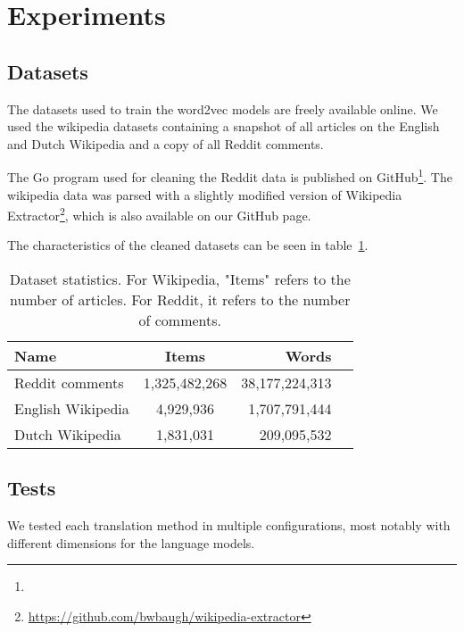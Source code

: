 \section{Experiments}
\label{sec:experiments}

\subsection{Datasets}
The datasets used to train the word2vec models are freely available online. We used the wikipedia datasets containing a snapshot of all articles on the English and Dutch Wikipedia and a copy of all Reddit comments.

The Go program used for cleaning the Reddit data is published on GitHub\footnote{\gh}. The wikipedia data was parsed with a slightly modified version of Wikipedia Extractor\footnote{\url{https://github.com/bwbaugh/wikipedia-extractor}}, which is also available on our GitHub page.

The characteristics of the cleaned datasets can be seen in table~\ref{table:datasets}.

%
%
\begin{table}[ht!]
	\centering
	\label{table:datasets}
	\begin{tabular}{|l|c|r|r|}
	\hline
	Name																												& Items			& Words			\\
	\hline
	Reddit comments \tablefootnote{\url{http://academictorrents.com/details/7690f71ea949b868080401c749e878f98de34d3d}} 	& 1,325,482,268 & 38,177,224,313\\
	English Wikipedia \tablefootnote{\url{https://dumps.wikimedia.org/enwiki/20150901/}}								& 4,929,936		& 1,707,791,444	\\
	Dutch Wikipedia \tablefootnote{\url{https://dumps.wikimedia.org/nlwiki/20150901/}}									& 1,831,031		& 209,095,532	\\
	\hline
	\end{tabular}
	\caption{Dataset statistics. For Wikipedia, "Items" refers to the number of articles. For Reddit, it refers to the number of comments.}
\end{table}

\subsection{Tests}
We tested each translation method in multiple configurations, most notably with different dimensions for the language models.

